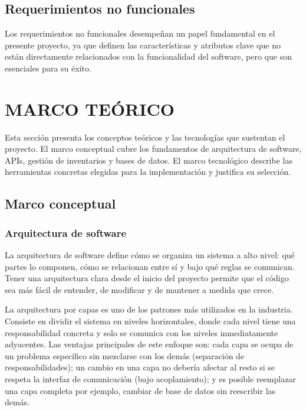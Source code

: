 \documentclass[spanish]{ieee_upb}
\begin{document}
\clearpage

\subsection{Requerimientos no funcionales}

Los requerimientos no funcionales desempeñan un papel fundamental en el presente proyecto, ya que definen las características y atributos clave que no están directamente relacionados con la funcionalidad del software, pero que son esenciales para su éxito.



\newpage
\section{MARCO TEÓRICO}

Esta sección presenta los conceptos teóricos y las tecnologías que sustentan el proyecto. El marco conceptual cubre los fundamentos de arquitectura de software, APIs, gestión de inventarios y bases de datos. El marco tecnológico describe las herramientas concretas elegidas para la implementación y justifica su selección.

\subsection{Marco conceptual}

\subsubsection{Arquitectura de software}

La arquitectura de software define cómo se organiza un sistema a alto nivel: qué partes lo componen, cómo se relacionan entre sí y bajo qué reglas se comunican. Tener una arquitectura clara desde el inicio del proyecto permite que el código sea más fácil de entender, de modificar y de mantener a medida que crece.

La arquitectura por capas es uno de los patrones más utilizados en la industria. Consiste en dividir el sistema en niveles horizontales, donde cada nivel tiene una responsabilidad concreta y solo se comunica con los niveles inmediatamente adyacentes. Las ventajas principales de este enfoque son: cada capa se ocupa de un problema específico sin mezclarse con los demás (separación de responsabilidades); un cambio en una capa no debería afectar al resto si se respeta la interfaz de comunicación (bajo acoplamiento); y es posible reemplazar una capa completa por ejemplo, cambiar de base de datos  sin reescribir las demás.
\end{document}
